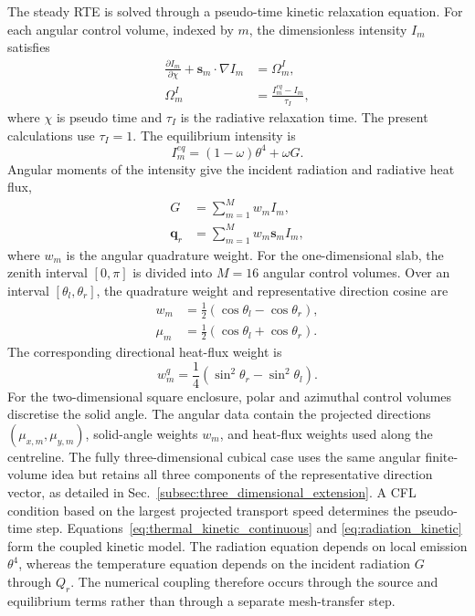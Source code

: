 \documentclass[a4paper,12pt]{ctexart}
\numberwithin{equation}{section}
\newcommand{\vb}[1]{\bm{#1}}
\newcommand{\vs}{\vb{s}}
\newcommand{\vq}{\vb{q}}
\begin{document}
The steady RTE is solved through a pseudo-time kinetic relaxation equation. For each angular control volume, indexed by $m$, the dimensionless intensity $I_m$ satisfies
\begin{equation}
\begin{aligned}
\frac{\partial I_m}{\partial \chi}+\vs_m\cdot\nabla I_m&=\Omega_m^I,
\\
\Omega_m^I&=\frac{I_m^{eq}-I_m}{\tau_I},
\end{aligned}
\label{eq:radiation_kinetic}
\end{equation}
where $\chi$ is pseudo time and $\tau_I$ is the radiative relaxation time. The present calculations use $\tau_I=1$. The equilibrium intensity is
\begin{equation}
I_m^{eq}=(1-\omega)\theta^4+\omega G.
\label{eq:radiation_equilibrium}
\end{equation}
Angular moments of the intensity give the incident radiation and radiative heat flux,
\begin{equation}
\begin{aligned}
G&=\sum_{m=1}^{M}w_m I_m,
\\
\vq_r&=\sum_{m=1}^{M}w_m\vs_m I_m,
\end{aligned}
\label{eq:angular_moments}
\end{equation}
where $w_m$ is the angular quadrature weight. For the one-dimensional slab, the zenith interval $[0,\pi]$ is divided into $M=16$ angular control volumes. Over an interval $[\theta_l,\theta_r]$, the quadrature weight and representative direction cosine are
\begin{equation*}
\begin{aligned}
w_m&=\frac{1}{2}(\cos\theta_l-\cos\theta_r),
\\
\mu_m&=\frac{1}{2}(\cos\theta_l+\cos\theta_r).
\end{aligned}
\end{equation*}
The corresponding directional heat-flux weight is
\begin{equation*}
w_m^q=\frac{1}{4}(\sin^2\theta_r-\sin^2\theta_l).
\end{equation*}
For the two-dimensional square enclosure, polar and azimuthal control volumes discretise the solid angle. The angular data contain the projected directions $(\mu_{x,m},\mu_{y,m})$, solid-angle weights $w_m$, and heat-flux weights used along the centreline. The fully three-dimensional cubical case uses the same angular finite-volume idea but retains all three components of the representative direction vector, as detailed in Sec.~\ref{subsec:three_dimensional_extension}. A CFL condition based on the largest projected transport speed determines the pseudo-time step. Equations~\eqref{eq:thermal_kinetic_continuous} and \eqref{eq:radiation_kinetic} form the coupled kinetic model. The radiation equation depends on local emission $\theta^4$, whereas the temperature equation depends on the incident radiation $G$ through $Q_r$. The numerical coupling therefore occurs through the source and equilibrium terms rather than through a separate mesh-transfer step.
\end{document}
